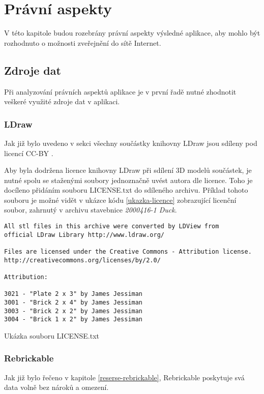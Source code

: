 \chapter{Právní aspekty} 
V této kapitole budou rozebrány právní aspekty výsledné aplikace, aby mohlo být rozhodnuto o možnosti zveřejnění do sítě Internet. 

\section{Zdroje dat}
Při analyzování právních aspektů aplikace je v první řadě nutné zhodnotit veškeré využité zdroje dat v aplikaci. 

\subsection{LDraw}
Jak již bylo uvedeno v sekci \autocite{reserse-ldraw} všechny součástky knihovny LDraw jsou sdíleny pod licencí \gls{CC-BY} \autocite{CC-BY}.

Aby byla dodržena licence knihovny LDraw při sdílení 3D modelů součástek, je nutné spolu se staženými soubory jednoznačně uvést autora dle licence. Toho je docíleno přidáním souboru LICENSE.txt do sdíleného archivu. Příklad tohoto souboru je možné vidět v ukázce kódu \ref{ukazka-licence} zobrazující licenční soubor, zahrnutý v archivu stavebnice \textit{2000416-1 Duck}.

\begin{listing}[htbp]
        \begin{verbatim}
All stl files in this archive were converted by LDView from 
official LDraw Library http://www.ldraw.org/

Files are licensed under the Creative Commons - Attribution license.
http://creativecommons.org/licenses/by/2.0/

Attribution:

3021 - "Plate 2 x 3" by James Jessiman
3001 - "Brick 2 x 4" by James Jessiman
3003 - "Brick 2 x 2" by James Jessiman
3004 - "Brick 1 x 2" by James Jessiman
        \end{verbatim}
    \caption{Ukázka souboru LICENSE.txt\label{ukazka-licence}}
\end{listing}

\subsection{Rebrickable}
Jak již bylo řečeno v kapitole \ref{reserse-rebrickable}, Rebrickable poskytuje svá data volně bez nároků a omezení.

